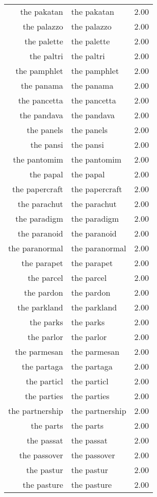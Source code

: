 \begin{table}[ht]
\begin{tabular}{rlr}
  the pakatan & the pakatan & 2.00 \\ 
  the palazzo & the palazzo & 2.00 \\ 
  the palette & the palette & 2.00 \\ 
  the paltri & the paltri & 2.00 \\ 
  the pamphlet & the pamphlet & 2.00 \\ 
  the panama & the panama & 2.00 \\ 
  the pancetta & the pancetta & 2.00 \\ 
  the pandava & the pandava & 2.00 \\ 
  the panels & the panels & 2.00 \\ 
  the pansi & the pansi & 2.00 \\ 
  the pantomim & the pantomim & 2.00 \\ 
  the papal & the papal & 2.00 \\ 
  the papercraft & the papercraft & 2.00 \\ 
  the parachut & the parachut & 2.00 \\ 
  the paradigm & the paradigm & 2.00 \\ 
  the paranoid & the paranoid & 2.00 \\ 
  the paranormal & the paranormal & 2.00 \\ 
  the parapet & the parapet & 2.00 \\ 
  the parcel & the parcel & 2.00 \\ 
  the pardon & the pardon & 2.00 \\ 
  the parkland & the parkland & 2.00 \\ 
  the parks & the parks & 2.00 \\ 
  the parlor & the parlor & 2.00 \\ 
  the parmesan & the parmesan & 2.00 \\ 
  the partaga & the partaga & 2.00 \\ 
  the particl & the particl & 2.00 \\ 
  the parties & the parties & 2.00 \\ 
  the partnership & the partnership & 2.00 \\ 
  the parts & the parts & 2.00 \\ 
  the passat & the passat & 2.00 \\ 
  the passover & the passover & 2.00 \\ 
  the pastur & the pastur & 2.00 \\ 
  the pasture & the pasture & 2.00 \\ 

\end{tabular}
\end{table}
